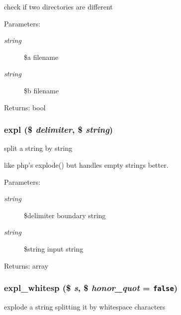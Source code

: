 check if two directories are different

\begin{Desc}
\item[Parameters:]
\begin{description}
\item[{\em string}]\$a filename \item[{\em string}]\$b filename \end{description}
\end{Desc}
\begin{Desc}
\item[Returns:]bool \end{Desc}
\hypertarget{util_8inc_8php_afce787d4b725ac62be6306ff3e352e7}{
\subsubsection[{expl}]{\setlength{\rightskip}{0pt plus 5cm}expl (\$ {\em delimiter}, \/  \$ {\em string})}}
\label{util_8inc_8php_afce787d4b725ac62be6306ff3e352e7}


split a string by string

like php's explode() but handles empty strings better. \begin{Desc}
\item[Parameters:]
\begin{description}
\item[{\em string}]\$delimiter boundary string \item[{\em string}]\$string input string \end{description}
\end{Desc}
\begin{Desc}
\item[Returns:]array \end{Desc}
\hypertarget{util_8inc_8php_1d2500a5e237e59956b03cbea845c95a}{
\subsubsection[{expl\_\-whitesp}]{\setlength{\rightskip}{0pt plus 5cm}expl\_\-whitesp (\$ {\em s}, \/  \$ {\em honor\_\-quot} = {\tt false})}}
\label{util_8inc_8php_1d2500a5e237e59956b03cbea845c95a}


explode a string splitting it by whitespace characters


